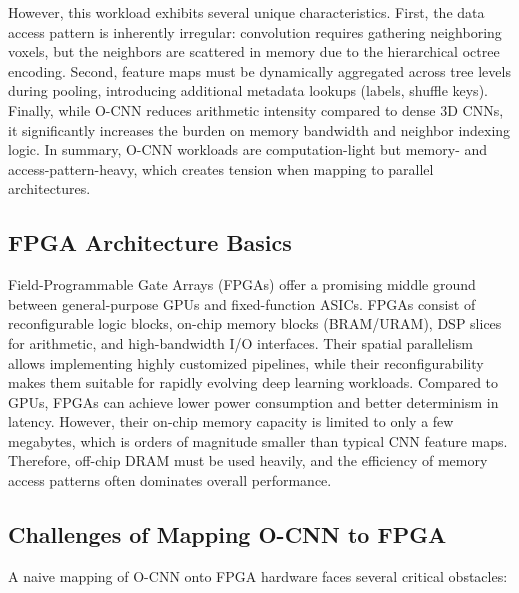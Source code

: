 \documentclass[sigconf, screen]{acmart}
\begin{document}
However, this workload exhibits several unique characteristics. First, the data access pattern is inherently irregular: convolution requires gathering neighboring voxels, but the neighbors are scattered in memory due to the hierarchical octree encoding. Second, feature maps must be dynamically aggregated across tree levels during pooling, introducing additional metadata lookups (labels, shuffle keys). Finally, while O-CNN reduces arithmetic intensity compared to dense 3D CNNs, it significantly increases the burden on memory bandwidth and neighbor indexing logic. In summary, O-CNN workloads are computation-light but memory- and access-pattern-heavy, which creates tension when mapping to parallel architectures.

\subsection{FPGA Architecture Basics}
Field-Programmable Gate Arrays (FPGAs) offer a promising middle ground between general-purpose GPUs and fixed-function ASICs. FPGAs consist of reconfigurable logic blocks, on-chip memory blocks (BRAM/URAM), DSP slices for arithmetic, and high-bandwidth I/O interfaces. Their spatial parallelism allows implementing highly customized pipelines, while their reconfigurability makes them suitable for rapidly evolving deep learning workloads. Compared to GPUs, FPGAs can achieve lower power consumption and better determinism in latency. However, their on-chip memory capacity is limited to only a few megabytes, which is orders of magnitude smaller than typical CNN feature maps. Therefore, off-chip DRAM must be used heavily, and the efficiency of memory access patterns often dominates overall performance.

\subsection{Challenges of Mapping O-CNN to FPGA}
A naive mapping of O-CNN onto FPGA hardware faces several critical obstacles:
\end{document}
